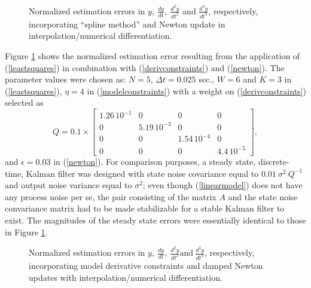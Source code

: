 \begin{figure}[hbt]
\centerline{}

\caption{Normalized estimation errors in \protect$y, \ \frac{dy}{dt}, \
\frac{d^2y}{dt^2}$ 
and  \protect$\frac{d^3y}{dt^3}$, respectively, incorporating 
``spline method'' and
Newton update in interpolation/numerical differentiation.}
\label{figsinespline}
\end{figure}


Figure \ref{figsinespline} shows the normalized estimation error resulting
from the application of (\ref{leastsquares})  in combination with
(\ref{derivconstraints})
and (\ref{newton}).   The parameter values were chosen as: $N=5$, $\Delta t = 0.025$
sec., $W=6$ and $K=3$  in (\ref{leastsquares}), $\eta = 4$ in 
(\ref{modelconstraints}) with
a weight on (\ref{derivconstraints}) selected as
\begin{equation} Q = 0.1 \times
\left[ \begin{array}{cccc} 1.26 \, 10^{-1} & 0 & 0 & 0 \\
0  & 5.19 \, 10^{-3}  & 0 & 0 \\
0 & 0 & 1.54 \, 10^{-4} & 0 \\
0 & 0 & 0 & 4.4 \, 10^{-5} 
\end{array} \right],
\end{equation}
and $\epsilon = 0.03$ in (\ref{newton}).   
For comparison purposes,
a steady state, discrete-time, Kalman filter was designed with 
state noise covariance equal to 
$0.01 \ \sigma^2 \ Q^{-1}$ and output noise variance equal to $\sigma^2$; even
though (\ref{linearmodel}) does not have any process noise per se, the pair
consisting of the matrix $A$ and the state noise convariance matrix
had to be made stabilizable
for a stable Kalman filter to exist.
The magnitudes of the steady state errors were essentially identical to those in 
Figure \ref{figsinespline}.


\begin{figure}[hbt]
\centerline{}

\caption{Normalized estimation errors in $y, \ \frac{dy}{dt}, \
\frac{d^2y}{dt^2} 
\mbox{and} \ \frac{d^3y}{dt^3}$, respectively, incorporating model derivative
constraints and damped Newton updates with 
interpolation/numerical differentiation.}
\label{figsinemodel}
\end{figure}


